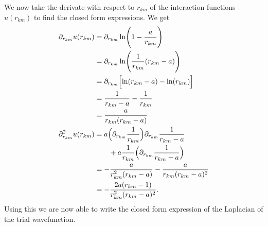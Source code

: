 \documentclass[
    a4paper, aps, twocolumn, floatfix, superscriptaddress]{revtex4-1}
\newcommand{\1}{\mathds{1}}
\begin{document}
            We now take the derivate with respect to $r_{km}$ of the interaction
            functions $u(r_{km})$ to find the closed form expressions. We get
            \begin{align}
                \partial_{r_{km}}u(r_{km})
                &=
                \partial_{r_{km}}
                \ln\Biggl(
                    1 - \frac{a}{r_{km}}
                \Biggr) \\
                &=
                \partial_{r_{km}}
                \ln\Biggl(
                    \frac{1}{r_{km}}
                    (r_{km} - a)
                \Biggr) \\
                &=
                \partial_{r_{km}}
                \Bigl[
                    \ln(r_{km} - a)
                    - \ln(r_{km})
                \Bigr] \\
                &=
                \frac{1}{r_{km} - a} - \frac{1}{r_{km}} \\
                &=
                \frac{a}{r_{km}(r_{km} - a)} \\
                \partial_{r_{km}}^2u(r_{km})
                &= a\Bigl(
                    \partial_{r_{km}}\frac{1}{r_{km}}
                \Bigr)
                \partial_{r_{km}}\frac{1}{r_{km} - a}
                \nonumber \\
                &\qquad
                + a\frac{1}{r_{km}}
                \Bigl(
                    \partial_{r_{km}}\frac{1}{r_{km} - a}
                \Bigr) \\
                &=
                -\frac{a}{r_{km}^2(r_{km} - a)}
                -\frac{a}{r_{km}(r_{km} - a)^2} \\
                &=
                - \frac{2a(r_{km} - 1)}{r_{km}^2(r_{km} - a)^2}.
            \end{align}
            Using this we are now able to write the closed form expression of
            the Laplacian of the trial wavefunction.
\end{document}
